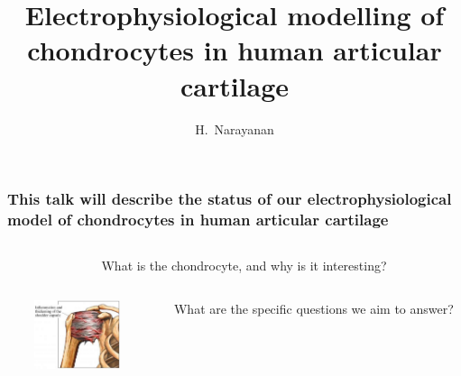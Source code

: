 \documentclass{beamer}
\title{Electrophysiological modelling of chondrocytes in human
  articular cartilage}
\author{H.~Narayanan}
\institute[]{}
\date[]{}
\begin{document}
%
%
%


\begin{frame}
  \frametitle{This talk will describe the status of our
    electrophysiological model of chondrocytes in human articular
    cartilage}
  \begin{columns}
    \begin{column}{3cm}
    \end{column}
    \begin{column}{9cm}
      What is the chondrocyte, and why is it interesting?
    \end{column}
  \end{columns}
  \vspace{0.3cm}
  \begin{columns}
    \begin{column}{1cm}
    \end{column}
    \begin{column}{2.5cm}
      \includegraphics[width=2.5cm]{../images/pdf/frozen-shoulder}
    \end{column}
    \begin{column}{0.1cm}
    \end{column}
    \begin{column}{8.5cm}
      What are the specific questions we aim to answer?
    \end{column}
  \end{columns}
  \vspace{0.3cm}
  \begin{columns}

\end{columns}
\end{frame}
\end{document}
